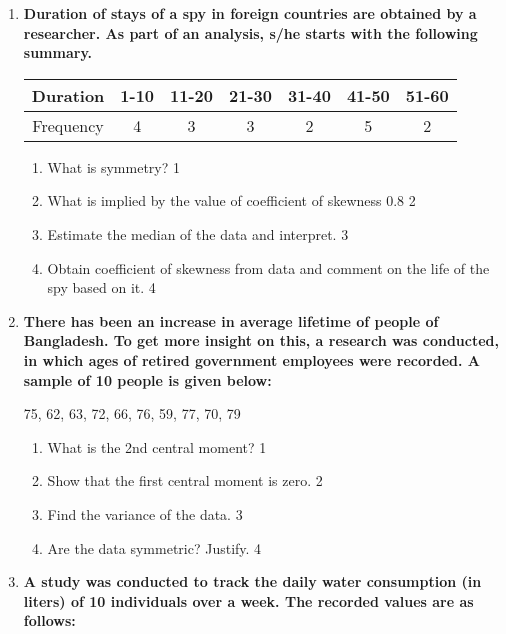 \documentclass[a4paper,oneside]{book}
\begin{document}
  \begin{enumerate}

   \item
	  \textbf{Duration of stays of a spy in foreign countries are obtained by a researcher. As part of an analysis, s/he starts with the following summary.} 
	  
	  \begin{table}[h]
	  \centering
\begin{tabular}{c|cccccc}
Duration & 1-10 & 11-20 & 21-30 & 31-40 & 41-50 & 51-60 \\ \hline
Frequency & 4 & 3 & 3 & 2 & 5 & 2
\end{tabular}
\end{table}
  
  \begin{enumerate}
    \item
	What is symmetry? \hfill 1
    \item
	What is implied by the value of coefficient of skewness 0.8 \hfill 2
    \item  
	Estimate the median of the data and interpret. \hfill 3
    \item
	Obtain coefficient of skewness from data and comment on the life of the spy based on it. \hfill 4
  \end{enumerate}


   \item
	  \textbf{There has been an increase in average lifetime of people of Bangladesh. To get more insight on this, a research was conducted, in which ages of retired government employees were recorded. A sample of 10 people is given below:}
	  
	  \begin{center}
	  75, 62, 63, 72, 66, 76, 59, 77, 70, 79
	  \end{center}
    \begin{enumerate}
    \item
	What is the 2nd central moment? \hfill 1
    \item
	Show that the first central moment is zero. \hfill 2
    \item  
	Find the variance of the data. \hfill 3
    \item
	Are the data symmetric? Justify. \hfill 4
  \end{enumerate}
  
  \item
\textbf{A study was conducted to track the daily water consumption (in liters) 
of 10 individuals over a week. The recorded values are as follows:}


\end{enumerate}
\end{document}
